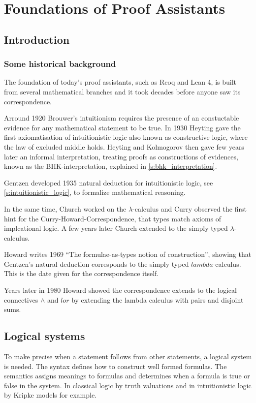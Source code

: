 \chapter{Foundations of Proof Assistants}
\label{c:chapter3}

\section{Introduction}

\subsection{Some historical background}

The foundation of today's proof assistants, such as Rcoq and Lean 4, is built from several mathematical branches and it took decades before anyone saw its correspondence.

Arround 1920 Brouwer's intuitionism requires the presence of an constuctable evidence for any mathematical statement to be true. In 1930 Heyting gave the first axiomatisation of intuitionistic logic also known as constructive logic, where the law of excluded middle holds. Heyting and Kolmogorov then gave few years later an informal interpretation, treating proofs as constructions of evidences, known as the BHK-interpretation, explained in \ref{s:bhk_interpretation}.

Gentzen developed 1935 natural deduction for intuitionistic logic, see \ref{s:intuitionistic_logic}, to formalize mathematical reasoning.

In the same time, Church worked on the $\lambda$-calculus and Curry observed the first hint for the Curry-Howard-Correspondence, that types match axioms of implcational logic. A few years later Church extended to the simply typed $\lambda$-calculus.

Howard writes 1969  “The formulae-as-types notion of construction”, showing that Gentzen's natural deduction corresponds to the simply typed $lambda$-calculus. This is the date given for the correspondence itself. 

Years later in 1980 Howard showed the correspondence extends to the logical connectives $\land$ and $lor$ by extending the lambda calculus with pairs and disjoint sums. \cite{wadler2015propositions}








\section{Logical systems}
To make precise when a statement follows from other statements, a logical system is needed. The syntax defines how to construct well formed formulas. The semantics assigns meanings to formulas and determines when a formula is true or false in the system. In classical logic by truth valuations and in intuitionistic logic by Kripke models for example.  

